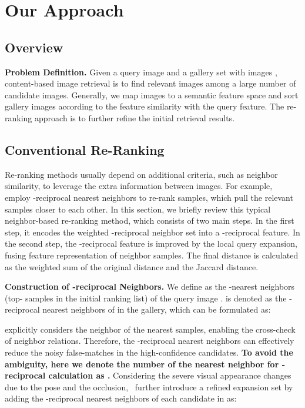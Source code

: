 \documentclass[10pt,twocolumn,letterpaper]{article}
\begin{document}
\section{Our Approach}
\subsection{Overview} 

\noindent  \textbf{Problem Definition.} \label{sec:definition}
Given a query image  and a gallery set with 
images ,
content-based image retrieval is to find relevant images among a large number of candidate images. Generally, we map images to a semantic feature space and sort gallery images according to the feature similarity with the query feature. The re-ranking approach is to further refine the initial retrieval results.

\subsection{Conventional Re-Ranking} \label{sec:rerank}
Re-ranking methods usually depend on additional criteria, such as neighbor similarity, to leverage the extra information between images. For example,~\cite{zhong2017re} employ -reciprocal nearest neighbors to re-rank samples, which pull the relevant samples closer to each other. 
In this section, we briefly review this typical neighbor-based re-ranking method, which consists of two main steps. In the first step, it encodes the weighted -reciprocal neighbor set into a -reciprocal feature. In the second step, the -reciprocal feature is improved by the local query expansion, fusing feature representation of neighbor samples. The final distance is calculated as the weighted sum of the original distance and the Jaccard distance. 


\noindent  \textbf{Construction of -reciprocal Neighbors.}
We define  as the -nearest neighbors (top- samples in the initial ranking list) of the query image .  is denoted as the -reciprocal nearest neighbors of  in the gallery, which can be formulated as:

 explicitly considers the neighbor of the nearest samples, enabling the cross-check of neighbor relations. Therefore, the -reciprocal nearest neighbors can effectively reduce the noisy false-matches in the high-confidence candidates.
\textbf{To avoid the ambiguity, here we denote the number of the nearest neighbor for -reciprocal calculation as .}
Considering the severe visual appearance changes due to the pose and the occlusion,~\cite{zhong2017re} further introduce a refined expansion set  by adding the -reciprocal
nearest neighbors of each candidate in  as:
\end{document}
